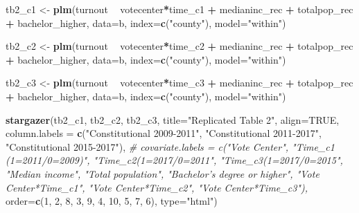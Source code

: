 \documentclass[
]{article}
\newenvironment{Shaded}{\begin{snugshade}}{\end{snugshade}}
\newcommand{\CommentTok}[1]{\textcolor[rgb]{0.56,0.35,0.01}{\textit{#1}}}
\newcommand{\DataTypeTok}[1]{\textcolor[rgb]{0.13,0.29,0.53}{#1}}
\newcommand{\DecValTok}[1]{\textcolor[rgb]{0.00,0.00,0.81}{#1}}
\newcommand{\KeywordTok}[1]{\textcolor[rgb]{0.13,0.29,0.53}{\textbf{#1}}}
\newcommand{\NormalTok}[1]{#1}
\newcommand{\OperatorTok}[1]{\textcolor[rgb]{0.81,0.36,0.00}{\textbf{#1}}}
\newcommand{\OtherTok}[1]{\textcolor[rgb]{0.56,0.35,0.01}{#1}}
\newcommand{\StringTok}[1]{\textcolor[rgb]{0.31,0.60,0.02}{#1}}
\begin{document}
\begin{Shaded}
\begin{Highlighting}[]
\NormalTok{tb2_c1 <-}\StringTok{ }\KeywordTok{plm}\NormalTok{(turnout }\OperatorTok{~}\StringTok{ }\NormalTok{votecenter}\OperatorTok{*}\NormalTok{time_c1 }\OperatorTok{+}\StringTok{ }\NormalTok{medianinc_rec }\OperatorTok{+}\StringTok{ }\NormalTok{totalpop_rec }\OperatorTok{+}\StringTok{ }\NormalTok{bachelor_higher, }\DataTypeTok{data=}\NormalTok{b, }\DataTypeTok{index=}\KeywordTok{c}\NormalTok{(}\StringTok{"county"}\NormalTok{), }\DataTypeTok{model=}\StringTok{"within"}\NormalTok{)}

\NormalTok{tb2_c2 <-}\StringTok{ }\KeywordTok{plm}\NormalTok{(turnout }\OperatorTok{~}\StringTok{ }\NormalTok{votecenter}\OperatorTok{*}\NormalTok{time_c2 }\OperatorTok{+}\StringTok{ }\NormalTok{medianinc_rec }\OperatorTok{+}\StringTok{ }\NormalTok{totalpop_rec }\OperatorTok{+}\StringTok{ }\NormalTok{bachelor_higher, }\DataTypeTok{data=}\NormalTok{b, }\DataTypeTok{index=}\KeywordTok{c}\NormalTok{(}\StringTok{"county"}\NormalTok{), }\DataTypeTok{model=}\StringTok{"within"}\NormalTok{) }

\NormalTok{tb2_c3 <-}\StringTok{ }\KeywordTok{plm}\NormalTok{(turnout }\OperatorTok{~}\StringTok{ }\NormalTok{votecenter}\OperatorTok{*}\NormalTok{time_c3 }\OperatorTok{+}\StringTok{ }\NormalTok{medianinc_rec }\OperatorTok{+}\StringTok{ }\NormalTok{totalpop_rec }\OperatorTok{+}\StringTok{ }\NormalTok{bachelor_higher, }\DataTypeTok{data=}\NormalTok{b, }\DataTypeTok{index=}\KeywordTok{c}\NormalTok{(}\StringTok{"county"}\NormalTok{), }\DataTypeTok{model=}\StringTok{"within"}\NormalTok{) }

\KeywordTok{stargazer}\NormalTok{(tb2_c1, tb2_c2, tb2_c3, }
          \DataTypeTok{title=}\StringTok{"Replicated Table 2"}\NormalTok{,}
          \DataTypeTok{align=}\OtherTok{TRUE}\NormalTok{,}
          \DataTypeTok{column.labels =} \KeywordTok{c}\NormalTok{(}\StringTok{"Constitutional 2009-2011"}\NormalTok{, }\StringTok{"Constitutional 2011-2017"}\NormalTok{, }\StringTok{"Constitutional 2015-2017"}\NormalTok{),}
          \CommentTok{# covariate.labels = c("Vote Center", "Time_c1 (1=2011/0=2009)", "Time_c2(1=2017/0=2011", "Time_c3(1=2017/0=2015", "Median income", "Total population", "Bachelor's degree or higher", "Vote Center*Time_c1", "Vote Center*Time_c2", "Vote Center*Time_c3"),}
          \DataTypeTok{order=}\KeywordTok{c}\NormalTok{(}\DecValTok{1}\NormalTok{, }\DecValTok{2}\NormalTok{, }\DecValTok{8}\NormalTok{, }\DecValTok{3}\NormalTok{, }\DecValTok{9}\NormalTok{, }\DecValTok{4}\NormalTok{, }\DecValTok{10}\NormalTok{, }\DecValTok{5}\NormalTok{, }\DecValTok{7}\NormalTok{, }\DecValTok{6}\NormalTok{),}
          \DataTypeTok{type=}\StringTok{"html"}\NormalTok{)}
\end{Highlighting}
\end{Shaded}
\end{document}
